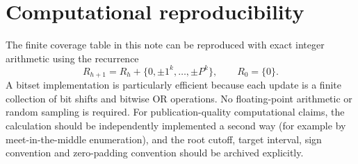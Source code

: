 \documentclass[../Axiomathic.tex]{subfiles}
\begin{document}
\section{Computational reproducibility}

The finite coverage table in this note can be reproduced with exact integer arithmetic using the recurrence
\[
  R_{h+1}=R_h+\{0,\pm1^k,\ldots,\pm P^k\},\qquad R_0=\{0\}.
\]
A bitset implementation is particularly efficient because each update is a finite collection of bit shifts and bitwise OR operations.  No floating-point arithmetic or random sampling is required.  For publication-quality computational claims, the calculation should be independently implemented a second way (for example by meet-in-the-middle enumeration), and the root cutoff, target interval, sign convention and zero-padding convention should be archived explicitly.
\end{document}
